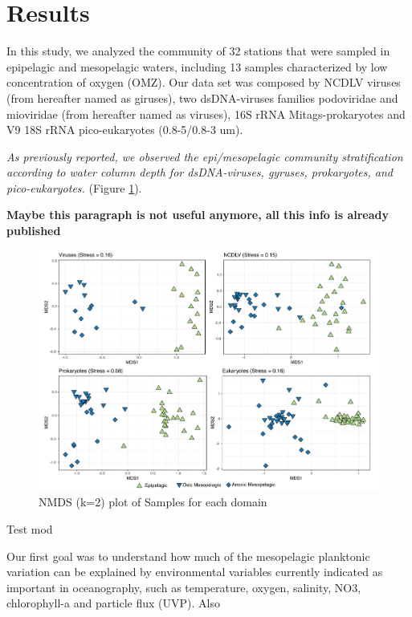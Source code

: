 \documentclass[fleqn,10pt]{wlscirep}
\begin{document}
\section*{Results}

In this study, we analyzed the community of 32 stations that were sampled in epipelagic and mesopelagic waters, including 13 samples characterized by low concentration of oxygen (OMZ). Our data set was composed by NCDLV viruses (from hereafter named as giruses), two dsDNA-viruses families podoviridae and mioviridae (from hereafter named as viruses), 16S rRNA Mitags-prokaryotes and V9 18S rRNA pico-eukaryotes (0.8-5/0.8-3 um).

\textit{As previously reported, we observed the epi/mesopelagic community stratification according to water column depth for dsDNA-viruses, gyruses, prokaryotes, and pico-eukaryotes.}  (Figure \ref{fig:nmds}).


\textbf{Maybe this paragraph is not useful anymore, all this info is already published}


\begin{figure}[ht]
    \centering
    \includegraphics[scale=0.5]{images/nmds_used_SF_to_print.pdf}
    \caption{NMDS (k=2) plot of Samples for each domain}
    \label{fig:nmds}
\end{figure}

Test mod

Our first goal was to understand how much of the mesopelagic planktonic variation can be explained by environmental variables currently indicated as important in oceanography, such as temperature, oxygen, salinity, NO3, chlorophyll-a and particle flux (UVP). Also 
\end{document}
